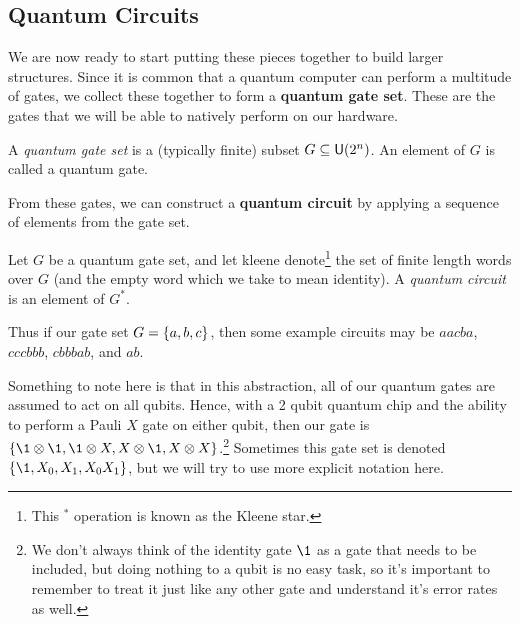 \subsection{Quantum Circuits}

We are now ready to start putting these pieces together to build larger structures.
Since it is common that a quantum computer can perform a multitude of gates, we collect these together to form a \textbf{quantum gate set}.
These are the gates that we will be able to natively perform on our hardware.
\begin{definition}
    A \emph{quantum gate set} is a (typically finite) subset $G \subseteq \mathsf{U} (2^n)$. An element of $G$ is called a quantum gate.
\end{definition}
From these gates, we can construct a \textbf{quantum circuit} by applying a sequence of elements from the gate set.
\begin{definition}\label{def:circuit}
    Let $G$ be a quantum gate set, and let \gls{kleene} denote\footnote{This $^*$ operation is known as the Kleene star.} the set of finite length words over $G$ (and the empty word which we take to mean identity).
    A \emph{quantum circuit} is an element of $G^*$.
\end{definition}
Thus if our gate set $G = \qty{a, b, c}$, then some example circuits may be $aacba$, $cccbbb$, $cbbbab$, and $ab$.

Something to note here is that in this abstraction, all of our quantum gates are assumed to act on all qubits.
Hence, with a 2 qubit quantum chip and the ability to perform a Pauli $X$ gate on either qubit, then our gate is $\qty{\1\otimes \1, \1\otimes X, X\otimes \1, X\otimes X}$.\footnote{We don't always think of the identity gate $\1$ as a gate that needs to be included, but doing nothing to a qubit is no easy task, so it's important to remember to treat it just like any other gate and understand it's error rates as well.}
Sometimes this gate set is denoted $\qty{\1, X_0, X_1, X_0X_1}$, but we will try to use more explicit notation here.

